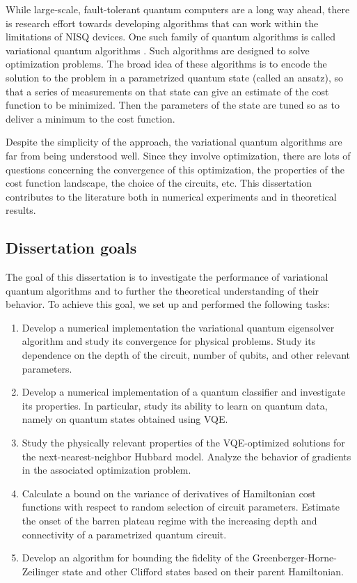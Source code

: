 While large-scale, fault-tolerant quantum computers are a long way ahead, there is research effort towards developing algorithms that can work within the limitations of NISQ devices. One such family of quantum algorithms is called variational quantum algorithms \cite{cerezo_variational_2020}. Such algorithms are designed to solve optimization problems. The broad idea of these algorithms is to encode the solution to the problem in a parametrized quantum state (called an ansatz), so that a series of measurements on that state can give an estimate of the cost function to be minimized. Then the parameters of the state are tuned so as to deliver a minimum to the cost function. 

Despite the simplicity of the approach, the variational quantum algorithms are far from being understood well. Since they involve optimization, there are lots of questions concerning the convergence of this optimization, the properties of the cost function landscape, the choice of the circuits, etc. This dissertation contributes to the literature both in numerical experiments and in theoretical results.

\subsection*{Dissertation goals} 

The goal of this dissertation is to investigate the performance of variational quantum algorithms and to further the theoretical understanding of their behavior. To achieve this goal, we set up and performed the following tasks:

\begin{enumerate}
    \item Develop a numerical implementation the variational quantum eigensolver algorithm and study its convergence for physical problems. Study its dependence on the depth of the circuit, number of qubits, and other relevant parameters.
    \item Develop a numerical implementation of a quantum classifier and investigate its properties. In particular, study its ability to learn on quantum data, namely on quantum states obtained using VQE.
    \item Study the physically relevant properties of the VQE-optimized solutions for the next-nearest-neighbor Hubbard model. Analyze the behavior of gradients in the associated optimization problem.
    \item Calculate a bound on the variance of derivatives of Hamiltonian cost functions with respect to random selection of circuit parameters. Estimate the onset of the barren plateau regime with the increasing depth and connectivity of a parametrized quantum circuit.
    \item Develop an algorithm for bounding the fidelity of the Greenberger-Horne-Zeilinger state and other Clifford states based on their parent Hamiltonian.
\end{enumerate}

